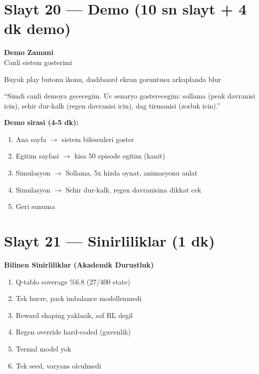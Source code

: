 \documentclass[11pt,a4paper]{article}
\begin{document}
\section{Slayt 20 --- Demo (10 sn slayt + 4 dk demo)}

\begin{slytboks}
\centering\Huge \textbf{Demo Zamani}\\[1em]
\large Canli sistem gosterimi
\end{slytboks}

\begin{gorselboks}
Buyuk play butonu ikonu, dashboard ekran goruntusu arkaplanda blur
\end{gorselboks}

\begin{sayboks}
``Simdi canli demoya gececegim. Uc senaryo gosterecegim: sollama (peak davranisi icin), sehir dur-kalk (regen davranisi icin), dag tirmanisi (zorluk icin).''

\textbf{Demo sirasi (4-5 dk):}
\begin{enumerate}
\item Ana sayfa $\to$ sistem bilesenleri goster
\item Egitim sayfasi $\to$ kisa 50 episode egitim (kanit)
\item Simulasyon $\to$ Sollama, 5x hizda oynat, animasyonu anlat
\item Simulasyon $\to$ Sehir dur-kalk, regen davranisina dikkat cek
\item Geri sunuma
\end{enumerate}
\end{sayboks}

\section{Slayt 21 --- Sinirliliklar (1 dk)}

\begin{slytboks}
\textbf{Bilinen Sinirliliklar (Akademik Durustluk)}
\begin{enumerate}
\item Q-tablo coverage \%6.8 (27/400 state)
\item Tek hucre, pack imbalance modellenmedi
\item Reward shaping yaklasik, saf RL degil
\item Regen override hard-coded (guvenlik)
\item Termal model yok
\item Tek seed, varyans olculmedi
\end{enumerate}
\end{slytboks}
\end{document}

